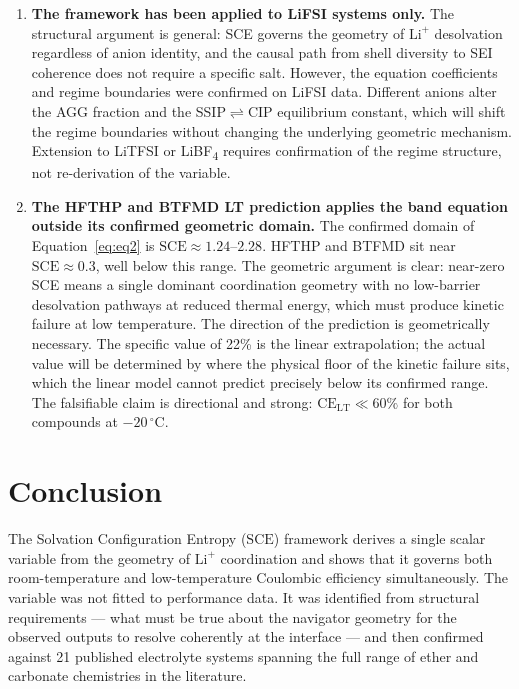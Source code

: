 \documentclass[12pt,letterpaper]{article}
\newcommand{\mSCE}{\mathrm{SCE}}
\newcommand{\mCELT}{\mathrm{CE}_{\mathrm{LT}}}
\begin{document}
\begin{enumerate}
  \item \textbf{The framework has been applied to
        LiFSI systems only.}
        The structural argument is general: SCE
        governs the geometry of $\mathrm{Li}^{+}$
        desolvation regardless of anion identity,
        and the causal path from shell diversity to
        SEI coherence does not require a specific
        salt.
        However, the equation coefficients and regime
        boundaries were confirmed on LiFSI data.
        Different anions alter the AGG fraction and
        the SSIP$\rightleftharpoons$CIP equilibrium
        constant, which will shift the regime
        boundaries without changing the underlying
        geometric mechanism.
        Extension to LiTFSI or
        LiBF\textsubscript{4} requires confirmation
        of the regime structure, not re-derivation
        of the variable.

  \item \textbf{The HFTHP and BTFMD LT prediction
        applies the band equation outside its
        confirmed geometric domain.}
        The confirmed domain of Equation~\ref{eq:eq2}
        is $\mSCE \approx 1.24$--$2.28$.
        HFTHP and BTFMD sit near $\mSCE \approx 0.3$,
        well below this range.
        The geometric argument is clear: near-zero SCE
        means a single dominant coordination geometry
        with no low-barrier desolvation pathways at
        reduced thermal energy, which must produce
        kinetic failure at low temperature.
        The direction of the prediction is
        geometrically necessary.
        The specific value of 22\% is the linear
        extrapolation; the actual value will be
        determined by where the physical floor of
        the kinetic failure sits, which the linear
        model cannot predict precisely below its
        confirmed range.
        The falsifiable claim is directional and
        strong: $\mCELT \ll 60\%$ for both compounds
        at $-20\,^{\circ}\mathrm{C}$.

\end{enumerate}

\section{Conclusion}
\label{sec:conclusion}

The Solvation Configuration Entropy ($\mSCE$) framework
derives a single scalar variable from the geometry of
$\mathrm{Li}^{+}$ coordination and shows that it governs
both room-temperature and low-temperature Coulombic
efficiency simultaneously.
The variable was not fitted to performance data.
It was identified from structural requirements ---
what must be true about the navigator geometry for the
observed outputs to resolve coherently at the interface
--- and then confirmed against 21 published electrolyte
systems spanning the full range of ether and carbonate
chemistries in the literature.
\end{document}
